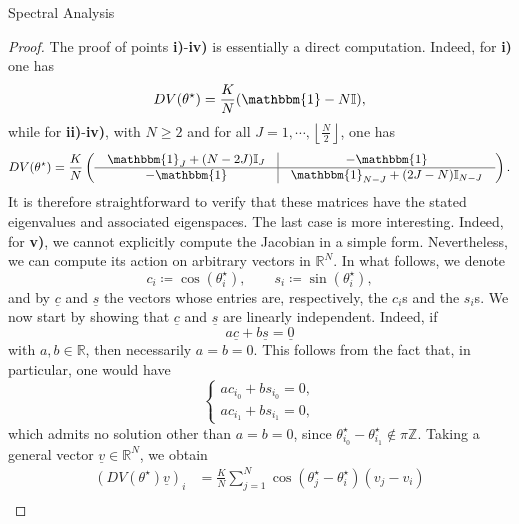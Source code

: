 \documentclass{article}
\theoremstyle{definition}
\newcommand{\R}{\mathbb{R}}
\newcommand{\Z}{\mathbb{Z}}
\begin{document}
\begin{section}{Spectral Analysis}
\begin{proof}
    The proof of points \textbf{i)}-\textbf{iv)} is essentially a direct computation. Indeed, for \textbf{i)} one has
    $$DV(\theta^\star)=\frac{K}{N}(\mathbbm{1}-N\mathbb{I}),$$
    while for \textbf{ii)}-\textbf{iv)}, with $N\geq2$ and for all $J=1,\cdots,\left\lfloor\frac{N}{2}\right\rfloor$, one has
$$DV(\theta^\star)=\frac{K}{N}\left(
\begin{array}{c|c}
\begin{array}{c}
\mathbbm{1}_J+(N-2J)\mathbb{I}_J\\
\end{array}
&
\begin{array}{c}
-\mathbbm{1}\\
\end{array}
\\
\hline
\begin{array}{c}
-\mathbbm{1}\\
\end{array}
&
\begin{array}{c}
\mathbbm{1}_{N-J}+(2J-N)\mathbb{I}_{N-J}\\
\end{array}
\end{array}
\right).$$
It is therefore straightforward to verify that these matrices have the stated eigenvalues and associated eigenspaces. The last case is more interesting. Indeed, for \textbf{v)}, we cannot explicitly compute the Jacobian in a simple form. Nevertheless, we can compute its action on arbitrary vectors in $\R^N$. In what follows, we denote
    $$c_i\coloneqq\cos(\theta^\star_i),\qquad s_i\coloneqq\sin(\theta^\star_i),$$
    and by $\underline{c}$ and $\underline{s}$ the vectors whose entries are, respectively, the $c_i$s and the $s_i$s. We now start by showing that $\underline{c}$ and $\underline{s}$ are linearly independent. Indeed, if
    $$a\underline{c}+b\underline{s}=\underline{0}$$
    with $a,b\in\R$, then necessarily $a=b=0$. This follows from the fact that, in particular, one would have
    $$\begin{cases}
        ac_{i_0}+bs_{i_0}=0,\\
        ac_{i_1}+bs_{i_1}=0,
    \end{cases}$$
    which admits no solution other than $a=b=0$, since $\theta^\star_{i_0}-\theta^\star_{i_1}\notin\pi\Z$. Taking a general vector $\underline{v}\in\R^N$, we obtain
    \begin{align*}
        \left(DV(\theta^\star)\underline{v}\right)_i
        &=\frac{K}{N}\sum_{j=1}^N\cos(\theta^\star_j-\theta^\star_i)(v_j-v_i)\\

\end{align*}
\end{proof}
\end{section}
\end{document}

